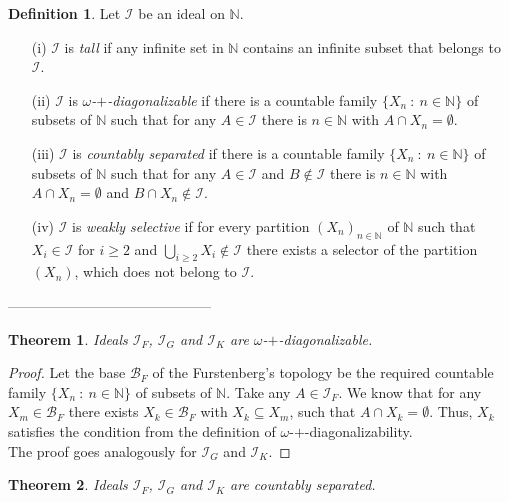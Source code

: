 \documentclass{amsart}
\newtheorem{thm}{Theorem}
\theoremstyle{definition}
\newtheorem{df}{Definition}
\theoremstyle{definition}
\newcommand{\N}{{\mathbb N}}
\newcommand{\I}{\mathcal I}
\newcommand{\B}{\mathcal{B}}
\begin{document}
\begin{df} Let $\mathcal{I}$ be an ideal on $\N$.
\begin{enumerate}
\item[(i)] $\mathcal{I}$ is \emph{tall} if any infinite set in $\N$ contains an infinite subset that belongs to $\mathcal{I}$. 
\item[(ii)] $\mathcal{I}$ is \emph{$\omega$-$+$-diagonalizable} if there is a countable family $\{X_n\ :\ n\in\N\}$ of subsets of $\N$ such that for any $A\in \mathcal{I}$ there is $n\in\N$ with $A\cap X_n=\emptyset$.
\item[(iii)] $\mathcal{I}$ is \emph{countably separated} if there is a countable family $\{X_n\ :\ n\in\N\}$ of subsets of $\N$ such that for any $A\in \mathcal{I}$ and $B\notin \mathcal{I}$ there is $n\in\N$ with $A\cap X_n=\emptyset$ and $B\cap X_n\notin \mathcal{I}$. %
\item[(iv)] $\mathcal{I}$ is \emph{weakly selective} if for every partition $(X_n)_{n\in\N}$ of $\N$ such that $X_i\in\I$ for $i\geq 2$ and $\bigcup_{i\geq 2} X_i \notin\I$ there exists a selector of the partition $(X_n)$, which does not belong to $\I$.
\end{enumerate}
\end{df}


--------------------------------------------

\begin{thm}
Ideals $\I_F$, $\I_G$ and $\I_K$ are $\omega$-$+$-diagonalizable.
\end{thm}

\begin{proof}
Let the base $\B_F$ of the Furstenberg's topology be the required countable family $\{X_n\ :\ n\in\N\}$ of subsets of $\N$. Take any $A\in \I_F$. We know that for any $X_m \in \B_F$ there exists $X_k \in \B_F$ with $X_k \subseteq X_m$, such that $A\cap X_k = \emptyset$. Thus, $X_k$ satisfies the condition from the definition of $\omega$-$+$-diagonalizability.\\
The proof goes analogously for $\I_G$ and $\I_K$.
\end{proof}


\begin{thm}
Ideals $\I_F$, $\I_G$ and $\I_K$ are countably separated.
\end{thm}
\end{document}
